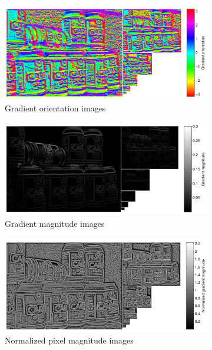 \documentclass[thesis.tex]{subfiles}
\begin{document}
\begin{figure}[tb]
    \centering
    \begin{subfigure}[t]{\textwidth}
		\includegraphics[width=\textwidth]{img/cellHistScaleSpacesV.pdf}
    	\caption{Gradient orientation images}
    	\label{fig:cellHistScaleSpacesV}
	\end{subfigure}
    \begin{subfigure}[t]{\textwidth}
		\includegraphics[width=\textwidth]{img/cellHistScaleSpacesM.pdf}
    	\caption{Gradient magnitude images}
    	\label{fig:cellHistScaleSpacesM}
	\end{subfigure}
	\begin{subfigure}[t]{\textwidth}
		\includegraphics[width=\textwidth]{img/cellHistScaleSpacesMnorm.pdf}
    	\caption{Normalized pixel magnitude images}
    	\label{fig:cellHistScaleSpacesMnorm}
	\end{subfigure}
	\caption{}
	\label{fig:cellHistScaleSpacesVM}
\end{figure}
\end{document}
